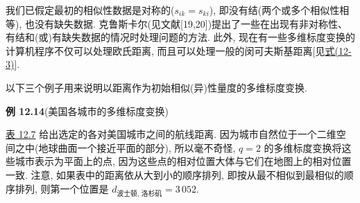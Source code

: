 我们已假定最初的相似性数据是对称的($s_{ik}=s_{ki}$), 即没有结(两个或多个相似性相等), 也没有缺失数据. 克鲁斯卡尔(见文献[19,20])提出了一些在出现有非对称性、有结和(或)有缺失数据的情况时处理问题的方法. 此外, 现在有一些多维标度变换的计算机程序不仅可以处理欧氏距离, 而且可以处理一般的闵可夫斯基距离[见\hyperref[eq:12-3]{式(12-3)}].

以下三个例子用来说明以距离作为初始相似(异)性量度的多维标度变换.

\noindent\textbf{例 12.14}\quad (美国各城市的多维标度变换)

\hyperref[tab:12.7]{表 12.7} 给出选定的各对美国城市之间的航线距离. 因为城市自然位于一个二维空间之中(地球曲面一个接近平面的部分), 所以毫不奇怪, $q=2$ 的多维标度变换将这些城市表示为平面上的点, 因为这些点的相对位置大体与它们在地图上的相对位置一致. 注意, 如果表中的距离依从大到小的顺序排列, 即按从最不相似到最相似的顺序排列, 则第一个位置是 $d_{\text{波士顿, 洛杉矶}}=3\,052$.
